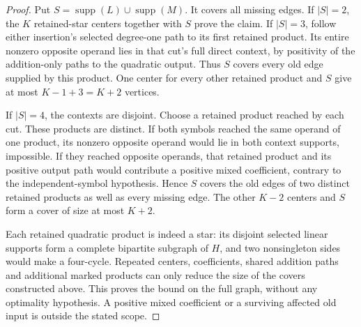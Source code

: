 \documentclass[11pt]{article}
\newcommand{\supp}{\operatorname{supp}}
\theoremstyle{definition}
\theoremstyle{remark}
\begin{document}
\begin{proof}
Put $S=\supp(L)\cup\supp(M)$. It covers all missing edges.
If $|S|=2$, the $K$ retained-star centers together with $S$ prove the claim.
If $|S|=3$, follow either insertion's selected degree-one path to its first
retained product. Its entire nonzero opposite operand lies in that cut's
full direct context, by positivity of the addition-only paths to the
quadratic output. Thus $S$ covers every old edge supplied by this product.
One center for every other retained product and $S$ give at most
$K-1+3=K+2$ vertices.

If $|S|=4$, the contexts are disjoint. Choose a retained product reached
by each cut. These products are distinct. If both symbols reached the
same operand of one product, its nonzero opposite operand would lie in
both context supports, impossible. If they reached opposite operands,
that retained product and its positive output path would contribute a
positive mixed coefficient, contrary to the independent-symbol hypothesis.
Hence $S$ covers the old edges of two distinct retained products as well
as every missing edge. The other $K-2$ centers and $S$ form a cover of size
at most $K+2$.

Each retained quadratic product is indeed a star: its disjoint selected
linear supports form a complete bipartite subgraph of $H$, and two
nonsingleton sides would make a four-cycle. Repeated centers, coefficients,
shared addition paths and additional marked products can only reduce the
size of the covers constructed above. This proves the bound on the full
graph, without any optimality hypothesis. A positive mixed coefficient
or a surviving affected old input is outside the stated scope.
\end{proof}
\end{document}
